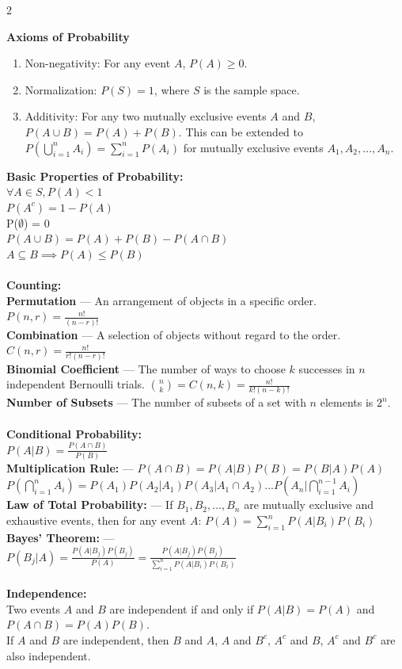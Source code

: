 \documentclass[10pt,letterpaper]{article}
\begin{document}
\begin{multicols}{2}

\textbf{Axioms of Probability}

\begin{enumerate}
    \item Non-negativity: For any event \( A \), \( P(A) \geq 0 \).
    \item Normalization: \( P(S) = 1 \), where \( S \) is the sample space.
    \item Additivity: For any two mutually exclusive events \( A \) and \( B \), \( P(A \cup B) = P(A) + P(B) \).
    This can be extended to $P(\bigcup_{i=1}^n A_i) = \sum_{i=1}^n P(A_i)$ for mutually exclusive events \( A_1, A_2, \ldots, A_n \).
\end{enumerate}

\textbf{Basic Properties of Probability:}\\
$\forall A \in S, P(A) < 1$\\
$P(A^c) = 1 - P(A)$\\
P($\emptyset$) = 0\\
$P(A \cup B) = P(A) + P(B) - P(A \cap B)$\\
$A \subseteq B \implies P(A) \leq P(B)$\\
\\
\textbf{Counting:}\\
\textbf{Permutation} --- An arrangement of objects in a specific order. $P(n, r) = \frac{n!}{(n-r)!}$\\
\textbf{Combination} --- A selection of objects without regard to the order. $C(n, r) = \frac{n!}{r!(n-r)!}$\\
\textbf{Binomial Coefficient} --- The number of ways to choose \( k \) successes in \( n \) independent Bernoulli trials. 
$\binom{n}{k} = C(n, k) = \frac{n!}{k!(n-k)!}$\\
\textbf{Number of Subsets} --- The number of subsets of a set with \( n \) elements is \( 2^n \).\\
\\
\textbf{Conditional Probability:}\\
$P(A|B) = \frac{P(A \cap B)}{P(B)}$\\
\textbf{Multiplication Rule:} --- $P(A \cap B) = P(A|B)P(B) = P(B|A)P(A)$\\
$P(\bigcap_{i=1}^n A_i) = P(A_1)P(A_2|A_1)P(A_3|A_1 \cap A_2)...P(A_n|\bigcap_{i=1}^{n-1} A_i)$\\
\textbf{Law of Total Probability:} --- If \( B_1, B_2, \ldots, B_n \) are mutually exclusive and exhaustive events, then for any event \( A \):
$P(A) = \sum_{i=1}^n P(A|B_i)P(B_i)$\\
\textbf{Bayes' Theorem:} --- \\
$P(B_j|A) = \frac{P(A|B_j)P(B_j)}{P(A)} = \frac{P(A|B_j)P(B_j)}{\sum_{i=1}^n P(A|B_i)P(B_i)}$\\
\\
\textbf{Independence:}\\
Two events \( A \) and \( B \) are independent if and only if $P(A|B) = P(A)$ and \( P(A \cap B) = P(A)P(B) \).\\
If $A$ and $B$ are independent, then $B$ and $A$, $A$ and $B^c$, $A^c$ and $B$, $A^c$ and $B^c$ are also independent.\\

\end{multicols}
\end{document}
